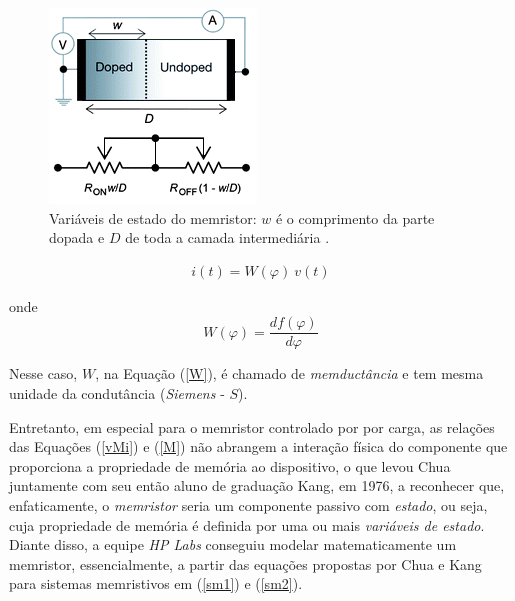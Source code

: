 \documentclass{ceel}
\begin{document}
\begin{multicols}{2}
\begin{figure}[H]
\centering
\includegraphics[width=0.7\columnwidth]{new-w}
\caption{Variáveis de estado do memristor: $w$ é o comprimento da parte dopada e $D$ de toda a camada intermediária \cite{image}.}\label{w}
\end{figure}

\vspace{-0.4cm}
\begin{gather}\label{iWv}
i(t)=W(\varphi)\ v(t)
\end{gather}

\noindent onde
\begin{equation} \label{W}
W(\varphi) =\dfrac{df(\varphi)}{d\varphi}
\end{equation}
\vspace{0.05cm}

Nesse caso, $W$, na Equação (\ref{W}), é chamado de \textit{memductância} e tem mesma unidade da condutância (\textit{Siemens} - $S$).

Entretanto, em especial para o memristor controlado por por carga, as relações das Equações (\ref{vMi}) e (\ref{M}) não abrangem a interação física do componente que proporciona a propriedade de memória ao dispositivo, o que levou Chua juntamente com seu então aluno de graduação Kang, em 1976, a reconhecer que, enfaticamente, o \emph{memristor} seria um componente passivo com \emph{estado}, ou seja, cuja propriedade de memória é definida por uma ou mais \emph{variáveis de estado}.
Diante disso, a equipe \emph{HP Labs} conseguiu modelar matematicamente um memristor, essencialmente, a partir das equações propostas por Chua e Kang \cite{1976} para sistemas memristivos em (\ref{sm1}) e (\ref{sm2}).


\end{multicols}
\end{document}
